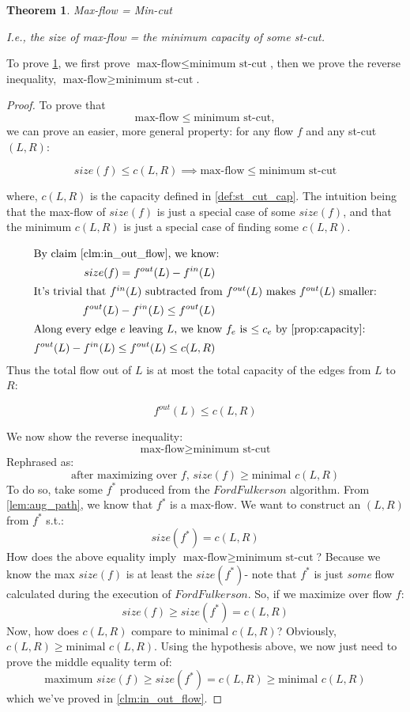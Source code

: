 \documentclass{article}
\newtheorem{theorem}{Theorem}[section]
\theoremstyle{definition}
\begin{document}
\begin{theorem}{Max-flow = Min-cut}
\label{thm:maxflowmincut}

I.e., the size of max-flow = the minimum capacity of some \textit{st-cut}.
\end{theorem}

To prove \ref{thm:maxflowmincut}, we first prove $\text{max-flow} \leq \text{minimum st-cut}$, then we prove the reverse inequality, $\text{max-flow} \geq \text{minimum st-cut}$.

\begin{proof}
	To prove that $$\text{max-flow} \leq \text{minimum st-cut},$$ we can prove an easier, more general property: for any flow $f$ and any st-cut $(L,R)$:
	
	$$size(f) \leq c(L,R) \implies \text{max-flow} \leq \text{minimum st-cut}$$
	
	where, $c(L,R)$ is the capacity defined in \ref{def:st_cut_cap}. The intuition being that the max-flow of $size(f)$ is just a special case of some $size(f)$, and that the minimum $c(L,R)$ is just a special case of finding some $c(L,R)$.
	
	\begin{align*}
		\shortintertext{By claim \ref{clm:in_out_flow}, we know:}
		size(f) = f^{out} (L) - f^{in} (L)\\
		\shortintertext{It's trivial that $f^{in}(L)$ subtracted from $f^{out}(L)$ makes $f^{out}(L)$ smaller:}
		f^{out} (L) - f^{in} (L) \leq f^{out}(L)\\
		\shortintertext{Along every edge $e$ leaving $L$, we know $f_e$ is $\leq c_e$ by \ref{prop:capacity}:} 
		f^{out} (L) - f^{in} (L) \leq f^{out}(L) \leq c(L,R)
	\end{align*}
	Thus the total flow out of $L$ is at most the total capacity of the edges from $L$ to $R$:

	$$f^{out}(L) \leq c(L,R)$$

	We now show the reverse inequality:
	$$\text{max-flow} \geq \text{minimum st-cut}$$
	Rephrased as:
	$$\text{after maximizing over $f$, } size(f) \geq \text{minimal }c(L,R)$$
	To do so, take some $f^*$ produced from the $FordFulkerson$ algorithm. From \ref{lem:aug_path}, we know that $f^*$ is a max-flow. We want to construct an $(L,R)$ from $f^*$ s.t.:
	$$size(f^*) = c(L,R)$$
	How does the above equality imply $\text{max-flow} \geq \text{minimum st-cut}$? Because we know the max $size(f)$ is at least the $size(f^*)$- note that $f^*$ is just \textit{some} flow calculated during the execution of $FordFulkerson$. 
	So, if we maximize over flow $f$:
	$$size(f) \geq size(f^*) = c(L,R)$$
	Now, how does $c(L,R)$ compare to $\text{minimal }c(L,R)$? Obviously, $c(L,R) \geq \text{minimal }c(L,R)$.
	Using the hypothesis above, we now just need to prove the middle equality term of:
	$$\text{maximum } size(f) \geq size(f^*) = c(L,R) \geq \text{minimal }c(L,R)$$
	which we've proved in \ref{clm:in_out_flow}.
\end{proof}
\end{document}
